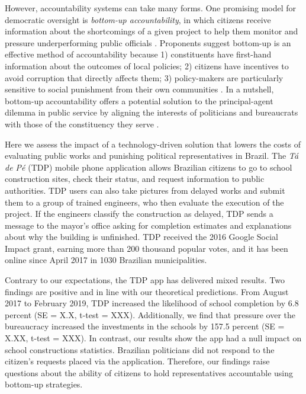 \documentclass[12pt,a4paper,]{article}
\begin{document}
However, accountability systems can take many forms. One promising model
for democratic oversight is \emph{bottom-up accountability}, in which
citizens receive information about the shortcomings of a given project
to help them monitor and pressure underperforming public officials
\citep{kosack2014does, molina2016community,raffler2018weakness}.
Proponents suggest bottom-up is an effective method of accountability
because 1) constituents have first-hand information about the outcomes
of local policies; 2) citizens have incentives to avoid corruption that
directly affects them; 3) policy-makers are particularly sensitive to
social punishment from their own communities
\citep[570]{serra2011combining}. In a nutshell, bottom-up accountability
offers a potential solution to the principal-agent dilemma in public
service by aligning the interests of politicians and bureaucrats with
those of the constituency they serve \citep[2]{raffler2018weakness}.

Here we assess the impact of a technology-driven solution that lowers
the costs of evaluating public works and punishing political
representatives in Brazil. The \emph{Tá de Pé} (TDP) mobile phone
application allows Brazilian citizens to go to school construction
sites, check their status, and request information to public
authorities. TDP users can also take pictures from delayed works and
submit them to a group of trained engineers, who then evaluate the
execution of the project. If the engineers classify the construction as
delayed, TDP sends a message to the mayor's office asking for completion
estimates and explanations about why the building is unfinished. TDP
received the 2016 Google Social Impact grant, earning more than 200
thousand popular votes, and it has been online since April 2017 in 1030
Brazilian municipalities.

Contrary to our expectations, the TDP app has delivered mixed results.
Two findings are positive and in line with our theoretical predictions.
From August 2017 to February 2019, TDP increased the likelihood of
school completion by 6.8 percent (SE = X.X, t-test = XXX). Additionally,
we find that pressure over the bureaucracy increased the investments in
the schools by 157.5 percent (SE = X.XX, t-test = XXX). In contrast, our
results show the app had a null impact on school constructions
statistics. Brazilian politicians did not respond to the citizen's
requests placed via the application. Therefore, our findings raise
questions about the ability of citizens to hold representatives
accountable using bottom-up strategies.
\end{document}
